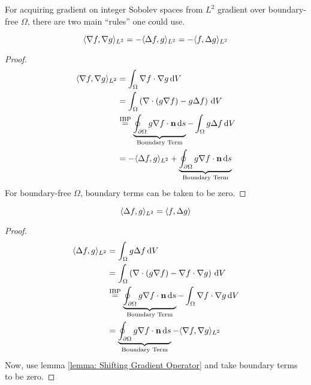 \documentclass[../dissertation.tex]{subfiles}
\begin{document}
For acquiring gradient on integer Sobolev spaces from $L^2$ gradient over boundary-free $\Omega$,
there are two main ``rules'' one could use.

\begin{lemma}
    \label{lemma: Shifting Gradient Operator}
    \begin{equation}
        \langle \nabla f,\nabla g \rangle_{L^2} = -\langle \Delta f, g \rangle_{L^2} = -\langle f, \Delta g \rangle_{L^2}
    \end{equation}
    \begin{proof}
        \begin{align*}
            \langle \nabla f, \nabla g \rangle_{L^2} &= \int_{\Omega} \nabla f \cdot \nabla g \, \text{d} V \\
            &= \int_{\Omega} \left( \nabla \cdot \left( g \nabla f \right) - g \Delta f \right) \, \text{d} V \\
            &\stackrel{\text{IBP}}{=} \underbrace{\oint_{\partial \Omega} g \nabla f \cdot \mathbf{n} \, \text{d} s}_{\text{Boundary Term}} - \int_{\Omega} g \Delta f \, \text{d} V\\
            &= -\langle \Delta f, g \rangle_{L^2} + \underbrace{\oint_{\partial \Omega} g \nabla f \cdot \mathbf{n} \, \text{d} s}_{\text{Boundary Term}}
        \end{align*}
        For boundary-free $\Omega$, boundary terms can be taken to be zero.
    \end{proof}
\end{lemma}

\begin{lemma}
    \label{lemma: Shifting Laplacian Operator}
    \begin{equation}
        \langle \Delta f, g \rangle_{L^2} = \langle f, \Delta g \rangle
    \end{equation}
    \begin{proof}
        \begin{align*}
            \langle \Delta f, g \rangle_{L^2} &= \int_{\Omega} g \Delta f \, \text{d} V \\
            &= \int_{\Omega} \left( \nabla \cdot \left( g \nabla f \right) - \nabla f \cdot \nabla g \right) \, \text{d} V \\
            &\stackrel{\text{IBP}}{=} \underbrace{\oint_{\partial \Omega} g \nabla f \cdot \mathbf{n} \, \text{d} s}_{\text{Boundary Term}} - \int_{\Omega} \nabla f \cdot \nabla g \, \text{d} V \\
            &= \underbrace{\oint_{\partial \Omega} g \nabla f \cdot \mathbf{n} \, \text{d} s}_{\text{Boundary Term}} - \langle \nabla f, \nabla g \rangle_{L^2}
        \end{align*}
        Now, use lemma \ref{lemma: Shifting Gradient Operator} and take boundary terms to be zero.
    \end{proof}
\end{lemma}
\end{document}
